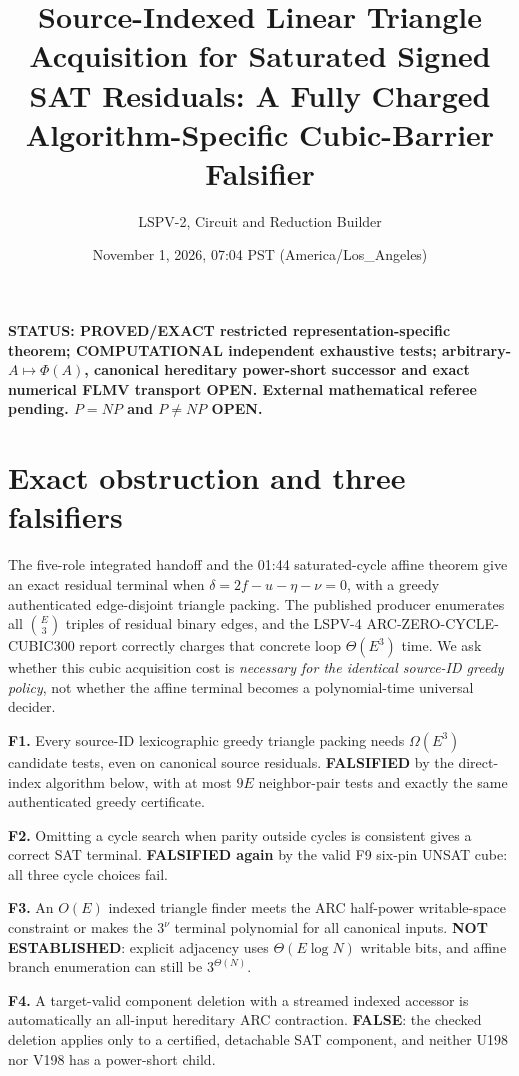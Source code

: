\documentclass[11pt]{article}
\title{Source-Indexed Linear Triangle Acquisition for Saturated Signed SAT Residuals: A Fully Charged Algorithm-Specific Cubic-Barrier Falsifier}
\author{LSPV-2, Circuit and Reduction Builder}
\date{November 1, 2026, 07:04 PST (America/Los\_Angeles)}
\begin{document}
\maketitle
\noindent\textbf{STATUS: PROVED/EXACT restricted representation-specific theorem; COMPUTATIONAL independent exhaustive tests; arbitrary-$A\mapsto\Phi(A)$, canonical hereditary power-short successor and exact numerical FLMV transport OPEN. External mathematical referee pending. $P=NP$ and $P\ne NP$ OPEN.}

\section{Exact obstruction and three falsifiers}
The five-role integrated handoff and the 01:44 saturated-cycle affine theorem give an exact residual terminal when $\delta=2f-u-\eta-\nu=0$, with a greedy authenticated edge-disjoint triangle packing. The published producer enumerates all $\binom E3$ triples of residual binary edges, and the LSPV-4 ARC-ZERO-CYCLE-CUBIC300 report correctly charges that concrete loop $\Theta(E^3)$ time. We ask whether this cubic acquisition cost is \emph{necessary for the identical source-ID greedy policy}, not whether the affine terminal becomes a polynomial-time universal decider.

\noindent\textbf{F1.} Every source-ID lexicographic greedy triangle packing needs $\Omega(E^3)$ candidate tests, even on canonical source residuals. \textbf{FALSIFIED} by the direct-index algorithm below, with at most $9E$ neighbor-pair tests and exactly the same authenticated greedy certificate.\par
\noindent\textbf{F2.} Omitting a cycle search when parity outside cycles is consistent gives a correct SAT terminal. \textbf{FALSIFIED again} by the valid F9 six-pin UNSAT cube: all three cycle choices fail.\par
\noindent\textbf{F3.} An $O(E)$ indexed triangle finder meets the ARC half-power writable-space constraint or makes the $3^\nu$ terminal polynomial for all canonical inputs. \textbf{NOT ESTABLISHED}: explicit adjacency uses $\Theta(E\log N)$ writable bits, and affine branch enumeration can still be $3^{\Theta(N)}$.\par
\noindent\textbf{F4.} A target-valid component deletion with a streamed indexed accessor is automatically an all-input hereditary ARC contraction. \textbf{FALSE}: the checked deletion applies only to a certified, detachable SAT component, and neither U198 nor V198 has a power-short child.
\end{document}
